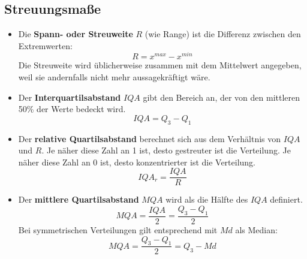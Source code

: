 \subsection{Streuungsmaße}
\begin{itemize}
    \item Die \textbf{Spann- oder Streuweite} $R$ (wie Range) ist die Differenz zwischen den Extremwerten:
    \[R = x^{max} - x^{min}\]
    Die Streuweite wird üblicherweise zusammen mit dem Mittelwert angegeben, weil sie andernfalls nicht mehr aussagekräftigt wäre.
    \item Der \textbf{Interquartilsabstand} $IQA$ gibt den Bereich an, der von den mittleren 50\% der Werte bedeckt wird.
    \[IQA = Q_3 - Q_1\]
    \item Der \textbf{relative Quartilsabstand} berechnet sich aus dem Verhältnis von $IQA$ und $R$.
    Je näher diese Zahl an 1 ist, desto gestreuter ist die Verteilung.
    Je näher diese Zahl an 0 ist, desto konzentrierter ist die Verteilung.
    \[IQA_r = \frac{IQA}{R}\]
    \item Der \textbf{mittlere Quartilsabstand} $MQA$ wird als die Hälfte des $IQA$ definiert.
    \[MQA = \frac{IQA}{2} = \frac{Q_3 - Q_1}{2}\]
    Bei symmetrischen Verteilungen gilt entsprechend mit $Md$ als Median:
    \[MQA = \frac{Q_3 - Q_1}{2} = Q_3 - Md\]
\end{itemize}


